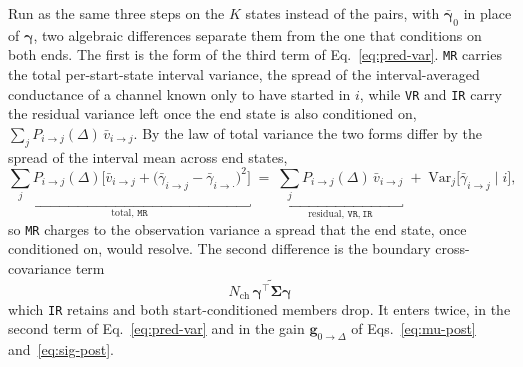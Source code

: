 \begin{appendixbox}
Run as the same three steps on the $K$ states instead of the pairs, with
$\bar{\boldsymbol{\gamma}}_0$ in place of $\boldsymbol{\gamma}$, two
algebraic differences separate them from the one that conditions on both ends. The first is
the form of the third term of Eq.~\ref{eq:pred-var}.
\texttt{MR} carries the total per-start-state interval variance, the spread of the
interval-averaged conductance of a channel known only to have started in $i$, while
\texttt{VR} and \texttt{IR} carry the residual variance left once the end state is also
conditioned on, $\sum_{j} P_{i\to j}(\Delta)\,\bar{v}_{i\to j}$. By the law
of total variance the two forms differ by the spread of the interval mean across end
states,
\begin{equation}
  \underbracket{\sum_{j} P_{i\to j}(\Delta)\bigl[\bar{v}_{i\to j}
    + \bigl(\bar{\gamma}_{i\to j}-\bar{\gamma}_{i\to\cdot}\bigr)^2\bigr]}_{\text{total, }\texttt{MR}}
  \;=\; \underbracket{\sum_{j} P_{i\to j}(\Delta)\,\bar{v}_{i\to j}}_{\text{residual, }\texttt{VR},\,\texttt{IR}}
  \;+\; \mathrm{Var}_{j}\bigl[\bar{\gamma}_{i\to j}\mid i\bigr],
  \label{eq:mr-vr}
\end{equation}
so \texttt{MR} charges to the observation variance a spread that the end state, once
conditioned on, would resolve. The second difference is the boundary cross-covariance term
\begin{equation}
  N_{\mathrm{ch}}\,\widetilde{\boldsymbol{\gamma}^\top\boldsymbol{\Sigma}\boldsymbol{\gamma}}
  \label{eq:mr-ir}
\end{equation}
which \texttt{IR} retains and both start-conditioned members drop. It enters twice, in the
second term of Eq.~\ref{eq:pred-var} and in the gain $\mathbf{g}_{0\to\Delta}$ of
Eqs.~\ref{eq:mu-post} and~\ref{eq:sig-post}.


\end{appendixbox}
